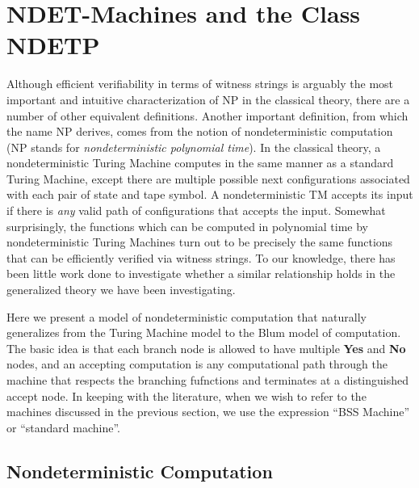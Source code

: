 \chapter{NDET-Machines and the Class NDETP}


Although efficient verifiability in terms of witness strings is
arguably the most important and intuitive characterization of NP in
the classical theory, there are a number of other equivalent
definitions.  Another important definition, from which the name NP
derives, comes from the notion of nondeterministic computation (NP
stands for \emph{nondeterministic polynomial time}).  In the classical
theory, a nondeterministic Turing Machine computes in the same manner
as a standard Turing Machine, except there are multiple possible next
configurations associated with each pair of state and tape symbol.  A
nondeterministic TM accepts its input if there is \emph{any} valid
path of configurations that accepts the input.  Somewhat surprisingly,
the functions which can be computed in polynomial time by
nondeterministic Turing Machines turn out to be precisely the same
functions that can be efficiently verified via witness strings.  To
our knowledge, there has been little work done to investigate whether
a similar relationship holds in the generalized theory we have been
investigating.

Here we present a model of nondeterministic computation that naturally
generalizes from the Turing Machine model to the Blum model of
computation.  The basic idea is that each branch node is allowed to
have multiple \textbf{Yes} and \textbf{No} nodes, and an accepting
computation is any computational path through the machine that
respects the branching fufnctions and terminates at a distinguished
accept node.  In keeping with the literature, when we wish to refer to
the machines discussed in the previous section, we use the expression
``BSS Machine'' or ``standard machine''.


\section{Nondeterministic Computation}

